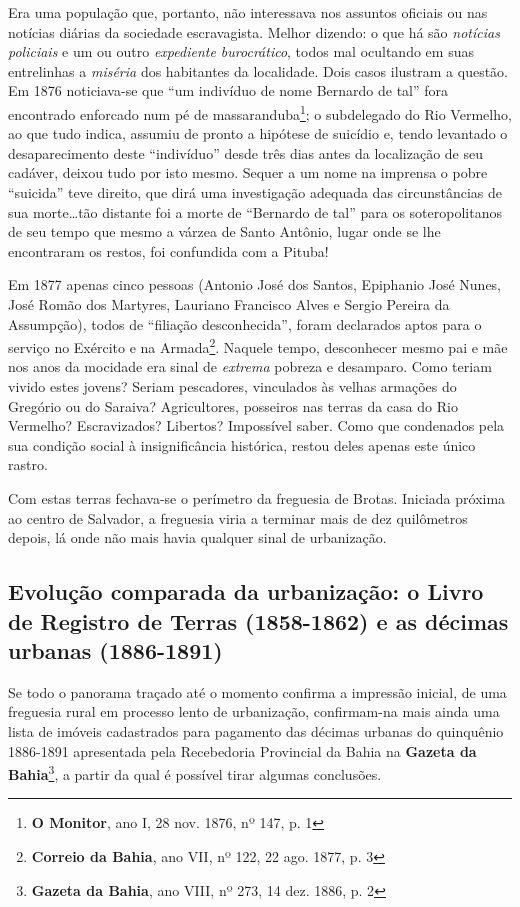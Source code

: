 Era uma população que, portanto, não interessava nos assuntos oficiais ou nas notícias diárias da sociedade escravagista. Melhor dizendo: o que há são \textit{notícias policiais} e um ou outro \textit{expediente burocrático}, todos mal ocultando em suas entrelinhas a \textit{miséria} dos habitantes da localidade. Dois casos ilustram a questão. Em 1876 noticiava-se que ``um indivíduo de nome Bernardo de tal'' fora encontrado enforcado num pé de massaranduba\footnote{\textbf{O Monitor}, ano I, 28 nov. 1876, nº 147, p. 1}; o subdelegado do Rio Vermelho, ao que tudo indica, assumiu de pronto a hipótese de suicídio e, tendo levantado o desaparecimento deste ``indivíduo'' desde três dias antes da localização de seu cadáver, deixou tudo por isto mesmo. Sequer a um nome na imprensa o pobre ``suicida'' teve direito, que dirá uma investigação adequada das circunstâncias de sua morte\dots tão distante foi a morte de ``Bernardo de tal'' para os soteropolitanos de seu tempo que mesmo a várzea de Santo Antônio, lugar onde se lhe encontraram os restos, foi confundida com a Pituba!

Em 1877 apenas cinco pessoas (Antonio José dos Santos, Epiphanio José Nunes, José Romão dos Martyres, Lauriano Francisco Alves e Sergio Pereira da Assumpção), todos de ``filiação desconhecida'', foram declarados aptos para o serviço no Exército e na Armada\footnote{\textbf{Correio da Bahia}, ano VII, nº 122, 22 ago. 1877, p. 3}. Naquele tempo, desconhecer mesmo pai e mãe nos anos da mocidade era sinal de \textit{extrema} pobreza e desamparo. Como teriam vivido estes jovens? Seriam pescadores, vinculados às velhas armações do Gregório ou do Saraiva? Agricultores, posseiros nas terras da casa do Rio Vermelho? Escravizados? Libertos? Impossível saber. Como que condenados pela sua condição social à insignificância histórica, restou deles apenas este único rastro.

Com estas terras fechava-se o perímetro da freguesia de Brotas. Iniciada próxima ao centro de Salvador, a freguesia viria a terminar mais de dez quilômetros depois, lá onde não mais havia qualquer sinal de urbanização.

\subsection{Evolução comparada da urbanização: o Livro de Registro de Terras (1858-1862) e as décimas urbanas (1886-1891)}

Se todo o panorama traçado até o momento confirma a impressão inicial, de uma freguesia rural em processo lento de urbanização, confirmam-na mais ainda uma lista de imóveis cadastrados para pagamento das décimas urbanas do quinquênio 1886-1891 apresentada pela Recebedoria Provincial da Bahia na \textbf{Gazeta da Bahia}\footnote{\textbf{Gazeta da Bahia}, ano VIII, nº 273, 14 dez. 1886, p. 2}, a partir da qual é possível tirar algumas conclusões.

